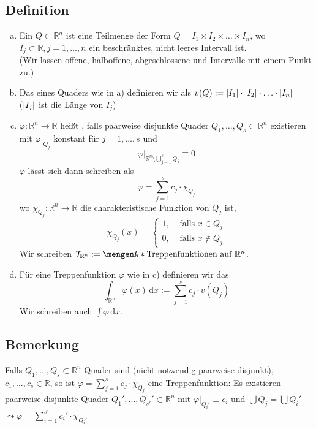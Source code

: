 \subsection[Definition: Quader, Volumen, Treppenfunktion]{Definition} %
\label{sub:31}
\begin{enumerate}[a)]
	\item Ein  $Q \subset \mathds{R}^n$ ist eine Teilmenge der Form $Q = I_1 \times I_2 \times \ldots \times I_n$, wo $I_j \subset \mathds{R}, j=1,\ldots ,n$
	ein beschränktes, nicht leeres Intervall ist. \\
	(Wir lassen offene, halboffene, abgeschlossene und Intervalle mit einem Punkt zu.)
	\item Das  eines Quaders wie in a) definieren wir als $v(Q) := \lvert I_1\rvert \cdot \lvert I_2\rvert \cdot \ldots \cdot \lvert I_n\rvert$ \\
	($\lvert I_j\rvert $ ist die Länge von $I_j$)
	\item $\varphi : \mathds{R}^n \to \mathds{R}$ heißt , falls paarweise disjunkte Quader $Q_1, \ldots , Q_s \subset \mathds{R}^n$ existieren mit
	$\varphi|_{Q_j}$ konstant für $j=1, \ldots ,s$ und 
	\[
		\varphi\Big|_{\mathds{R}^n \setminus \bigcup_{j=1}^s Q_j} \equiv 0
	\]
	$\varphi$ lässt sich dann schreiben als
	\[
		\varphi = \sum_{j=1}^{s} c_j \cdot \chi_{Q_j}
	\]
	wo $\chi_{Q_j} : \mathds{R}^n \to \mathds{R}$ die charakteristische Funktion von $Q_j$ ist, 
	\[
		\chi_{Q_j}(x) = \begin{cases}
			1, &\text{ falls }x \in Q_j\\
			0, &\text{ falls }x \not\in Q_j 
		\end{cases}
	\]
	Wir schreiben $\mathcal{T}_{\mathds{R}^n} := \set{\text{Treppenfunktionen auf }\mathds{R}^n} $.
	\item Für eine Treppenfunktion $\varphi$ wie in c) definieren wir das 
	\[
		\int_{\mathds{R}^n} \! \varphi(x)  \, \mathrm{d}x  :=  \sum_{j=1}^{s} c_j \cdot v(Q_j)
	\]
	Wir schreiben auch $\int\! \varphi  \, \mathrm{d}x$.
\end{enumerate}

\subsection[Bemerkung: Zerlegung von Quadern in disjunkte Quader]{Bemerkung} %
\label{sub:32}
Falls $Q_1, \ldots , Q_s \subset \mathds{R}^n$ Quader sind (nicht notwendig paarweise disjunkt), $c_1, \ldots , c_s \in \mathds{R}$, so ist 
$\varphi = \sum_{j=1}^{s} c_j \cdot \chi_{Q_j}$ eine Treppenfunktion: Es existieren paarweise disjunkte Quader $Q_1', \ldots , Q_{s'}' \subset \mathds{R}^n$ mit
$\varphi|_{Q_i'} \equiv c_i$ und $\bigcup Q_j = \bigcup Q_i'$ $\leadsto \varphi = \sum_{i=1}^{s'} c_i' \cdot \chi_{Q_i'}$

